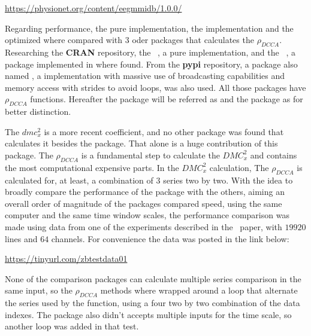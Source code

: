 \documentclass[nojss]{jss}
\begin{document}
\begin{center}
	\url{https://physionet.org/content/eegmmidb/1.0.0/}
\end{center}


Regarding performance, the pure  implementation, the  implementation and the optimized  where compared with 3 oder packages that calculates the $\rho_{DCCA}$. Researching the  \textbf{CRAN} repository, the ~\citep{R-DFA}, a pure  implementation, and  the ~\citep{R-DCCA},  a  package implemented in  where found. From the  \textbf{pypi} repository, a package also named \citep{alchieri2024lateralization}, a  implementation with massive use of  broadcasting capabilities and memory access with strides to avoid loops, was also used. All those packages have $\rho_{DCCA}$ functions. Hereafter the   package will be referred as  and the   package as  for better distinction.

The $dmc_{x}^{2}$ is a more recent coefficient, and no other package was found that calculates it besides the  package. That alone is a huge contribution of this package. The $\rho_{DCCA}$ is a fundamental step to calculate the $DMC_{x}^{2}$ and contains the most computational expensive parts. In the $DMC_{x}^{2}$ calculation, The $\rho_{DCCA}$ is calculated for, at least, a combination of 3 series two by two. With the idea to broadly compare the performance of the  package with the others, aiming an overall order of magnitude of the packages compared speed, using the same computer and the same time window scales, the performance comparison was made using data from one of the experiments described in the~\cite{schalk2004bci2000} paper, with $19920$ lines and $64$ channels. For convenience the data was posted in the link below:

\begin{center}
  	\url{https://tinyurl.com/zbtestdata01}
\end{center}

None of the comparison packages can calculate multiple series comparison in the same input, so the $\rho_{DCCA}$ methods where wrapped around a loop that alternate the series used by the function, using a four two by two combination of the data indexes. The  package also didn't accepts multiple inputs for the time scale, so another loop was added in that test. 
\end{document}
